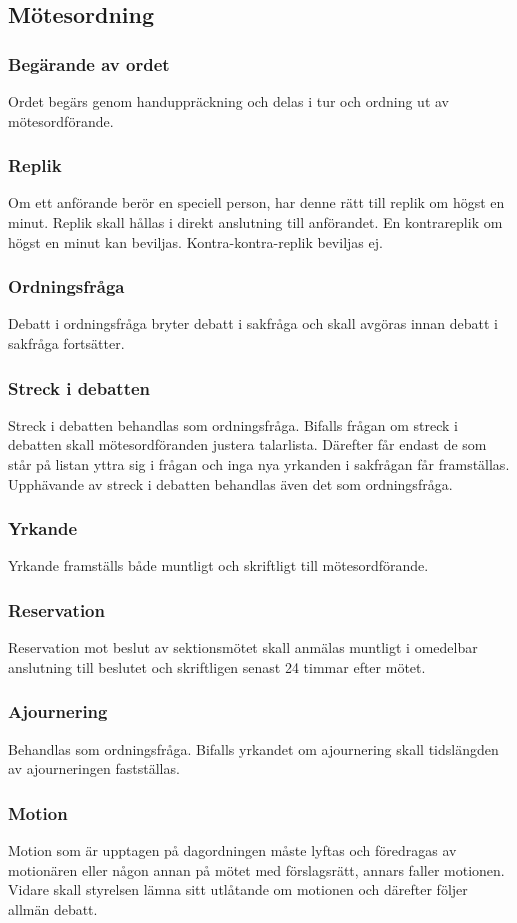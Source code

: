 \documentclass[a4paper, 10pt]{article}
\begin{document}
\subsection{Mötesordning}
\subsubsection{Begärande av ordet}
Ordet begärs genom handuppräckning och delas i tur och ordning ut av mötesordförande. 
\subsubsection{Replik}
Om ett anförande berör en speciell person, har denne rätt till replik om högst en minut. Replik skall hållas i direkt anslutning till anförandet. En kontrareplik om högst en minut kan beviljas. Kontra-kontra-replik beviljas ej. 
\subsubsection{Ordningsfråga}
Debatt i ordningsfråga bryter debatt i sakfråga och skall avgöras innan debatt i sakfråga fortsätter. 
\subsubsection{Streck i debatten}
Streck i debatten behandlas som ordningsfråga. Bifalls frågan om streck i debatten skall mötesordföranden justera talarlista. Därefter får endast de som står på listan yttra sig i frågan och inga nya yrkanden i sakfrågan får framställas. 
Upphävande av streck i debatten behandlas även det som ordningsfråga. 
\subsubsection{Yrkande}
Yrkande framställs både muntligt och skriftligt till mötesordförande. 
\subsubsection{Reservation}
Reservation mot beslut av sektionsmötet skall anmälas muntligt i omedelbar anslutning till beslutet och skriftligen senast 24 timmar efter mötet. 
\subsubsection{Ajournering}
Behandlas som ordningsfråga. Bifalls yrkandet om ajournering skall tidslängden av ajourneringen fastställas. 
\subsubsection{Motion} 
Motion som är upptagen på dagordningen måste lyftas och föredragas av motionären eller någon annan på mötet med förslagsrätt, annars faller motionen. Vidare skall styrelsen lämna sitt utlåtande om motionen och därefter följer allmän debatt. 
\newpage
\end{document}
